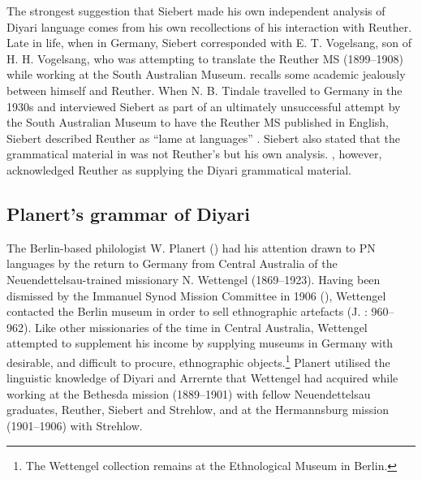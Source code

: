 The strongest suggestion that Siebert made his own independent analysis of Diyari language comes from his own recollections of his interaction with Reuther. Late in life, when in Germany, Siebert corresponded with E. T. Vogelsang, son of H. H. Vogelsang, who was attempting to translate the Reuther MS (1899--1908) while working at the South Australian Museum. \citet{siebert_letter_1935} recalls some academic jealously between himself and Reuther. When N. B. Tindale travelled to Germany in the 1930s and interviewed Siebert as part of an ultimately unsuccessful attempt by the South Australian Museum to have the Reuther MS published in English, Siebert described Reuther as “lame at languages” \citep{tindale_report_1937}. Siebert also stated that the grammatical material in \citet{eylmann_eingeborenen_1908} was not Reuther’s but his own analysis. \citet[93]{eylmann_eingeborenen_1908}, however, acknowledged Reuther as supplying the Diyari grammatical material.

\subsection{Planert’s grammar of Diyari \citeyearpar{planert_australische_1908}}
\label{sec:key:8.4.3}\label{bkm:Ref74225865}\label{bkm:Ref514690025}\label{bkm:Ref340578477}\label{bkm:Ref340216645}\label{bkm:Ref456334295}\label{bkm:Ref326948465}
The Berlin-based philologist W. Planert {() had his attention} drawn to PN languages by the return to Germany from Central Australia of the Neuendettelsau-trained missionary N. Wettengel (1869–1923). Having been dismissed by the Immanuel Synod Mission Committee in 1906 (), Wettengel contacted the Berlin museum in order to sell ethnographic artefacts (J. \citealt{strehlow_tale_2011}: 960--962). Like other missionaries of the time in Central Australia, Wettengel attempted to supplement his income by supplying museums in Germany with desirable, and difficult to procure, ethnographic objects.\footnote{The Wettengel collection remains at the Ethnological Museum in Berlin.}  Planert utilised the linguistic knowledge of Diyari and Arrernte that Wettengel had acquired while working at the Bethesda mission (1889–1901) with fellow Neuendettelsau graduates, Reuther, Siebert and Strehlow, and at the Hermannsburg mission (1901–1906) with Strehlow.

